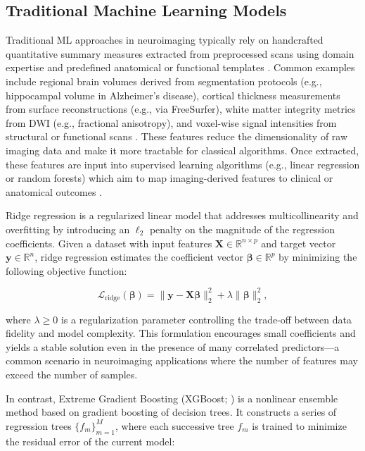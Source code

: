 \subsection{Traditional Machine Learning Models}
Traditional ML approaches in neuroimaging typically rely on handcrafted quantitative summary measures extracted from preprocessed scans using domain expertise and predefined anatomical or functional templates \cite{Mwangi2014-nl}. Common examples include regional brain volumes derived from segmentation protocols (e.g., hippocampal volume in Alzheimer’s disease), cortical thickness measurements from surface reconstructions (e.g., via FreeSurfer), white matter integrity metrics from DWI (e.g., fractional anisotropy), and voxel-wise signal intensities from structural or functional scans \cite{Abraham2014-va, Coupe2019-pe}. These features reduce the dimensionality of raw imaging data and make it more tractable for classical algorithms. Once extracted, these features are input into supervised learning algorithms (e.g., linear regression or random forests) which aim to map imaging-derived features to clinical or anatomical outcomes \cite{Mateos-Perez2018-xb,Jollans2019-mv,Sarica2017-dz}.

Ridge regression \cite{Hoerl1970-so} is a regularized linear model that addresses multicollinearity and overfitting by introducing an $\ell_2$ penalty on the magnitude of the regression coefficients. Given a dataset with input features $\mathbf{X} \in \mathbb{R}^{n \times p}$ and target vector $\mathbf{y} \in \mathbb{R}^n$, ridge regression estimates the coefficient vector $\boldsymbol{\beta} \in \mathbb{R}^p$ by minimizing the following objective function:

\begin{equation}
    \mathcal{L}_{\text{ridge}}(\boldsymbol{\beta}) = \|\mathbf{y} - \mathbf{X}\boldsymbol{\beta}\|_2^2 + \lambda \|\boldsymbol{\beta}\|_2^2,
\end{equation}

where $\lambda \geq 0$ is a regularization parameter controlling the trade-off between data fidelity and model complexity. This formulation encourages small coefficients and yields a stable solution even in the presence of many correlated predictors—a common scenario in neuroimaging applications where the number of features may exceed the number of samples.

In contrast, Extreme Gradient Boosting (XGBoost; \cite{Chen2016-ew}) is a nonlinear ensemble method based on gradient boosting of decision trees. It constructs a series of regression trees $\{f_m\}_{m=1}^M$, where each successive tree $f_m$ is trained to minimize the residual error of the current model:

